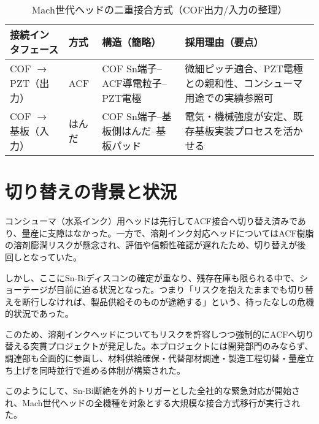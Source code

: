 \documentclass[conference]{IEEEtran}
\begin{document}
\begin{table}[t]
\centering
\footnotesize
\caption{Mach世代ヘッドの二重接合方式（COF出力/入力の整理）}
\label{tab:dual-bond}
\renewcommand{\arraystretch}{1.1}
\begin{tabularx}{\columnwidth}{@{}p{1.95cm} p{1.25cm} Y Y@{}}
\toprule
接続インタフェース & 方式 & 構造（簡略） & 採用理由（要点） \\
\midrule
COF $\rightarrow$ PZT（出力） & ACF &
COF Sn端子–ACF導電粒子–PZT電極 &
微細ピッチ適合、PZT電極との親和性、コンシューマ用途での実績参照可 \\
\addlinespace[2pt]
COF $\rightarrow$ 基板（入力） & はんだ &
COF Sn端子–基板側はんだ–基板パッド &
電気・機械強度が安定、既存基板実装プロセスを活かせる \\
\bottomrule
\end{tabularx}
\end{table}

\section{切り替えの背景と状況}
コンシューマ（水系インク）用ヘッドは先行してACF接合へ切り替え済みであり、量産に支障はなかった。一方で、溶剤インク対応ヘッドについてはACF樹脂の溶剤膨潤リスクが懸念され、評価や信頼性確認が遅れたため、切り替えが後回しとなっていた。  

しかし、ここにSn-Biディスコンの確定が重なり、残存在庫も限られる中で、ショーテージが目前に迫る状況となった。つまり「リスクを抱えたままでも切り替えを断行しなければ、製品供給そのものが途絶する」という、待ったなしの危機的状況であった。  

このため、溶剤インクヘッドについてもリスクを許容しつつ強制的にACFへ切り替える突貫プロジェクトが発足した。本プロジェクトには開発部門のみならず、調達部も全面的に参画し、材料供給確保・代替部材調達・製造工程切替・量産立ち上げを同時並行で進める体制が構築された。  

このようにして、Sn-Bi断絶を外的トリガーとした全社的な緊急対応が開始され、Mach世代ヘッドの全機種を対象とする大規模な接合方式移行が実行された。
\end{document}
